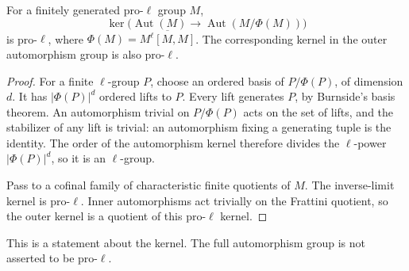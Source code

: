 \begin{lemma}
\label{lem:ff3-frattini}

For a finitely generated pro-\(\ell\) group \(M\), \[
 \ker\bigl(\operatorname{Aut}(M)\to
            \operatorname{Aut}(M/\Phi(M))\bigr)
\] is pro-\(\ell\), where \(\Phi(M)=\overline{M^\ell[M,M]}\). The corresponding kernel in the outer automorphism group is also pro-\(\ell\).

\end{lemma}
\begin{proof}

For a finite \(\ell\)-group \(P\), choose an ordered basis of \(P/\Phi(P)\), of dimension \(d\). It has \(|\Phi(P)|^d\) ordered lifts to \(P\). Every lift generates \(P\), by Burnside's basis theorem. An automorphism trivial on \(P/\Phi(P)\) acts on the set of lifts, and the stabilizer of any lift is trivial: an automorphism fixing a generating tuple is the identity. The order of the automorphism kernel therefore divides the \(\ell\)-power \(|\Phi(P)|^d\), so it is an \(\ell\)-group.

Pass to a cofinal family of characteristic finite quotients of \(M\). The inverse-limit kernel is pro-\(\ell\). Inner automorphisms act trivially on the Frattini quotient, so the outer kernel is a quotient of this pro-\(\ell\) kernel.

\end{proof}

This is a statement about the kernel. The full automorphism group is not asserted to be pro-\(\ell\).

